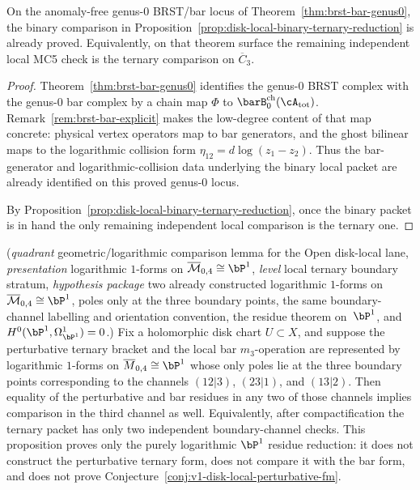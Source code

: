 \begin{corollary}\label{cor:disk-local-ternary-on-brstbar-locus}
On the anomaly-free genus-$0$ BRST/bar locus of
Theorem~\ref{thm:brst-bar-genus0}, the binary comparison in
Proposition~\ref{prop:disk-local-binary-ternary-reduction} is already
proved. Equivalently, on that theorem surface the remaining
independent local MC5 check is the ternary comparison on
$\overline{C}_3$.
\end{corollary}

\begin{proof}
Theorem~\ref{thm:brst-bar-genus0} identifies the genus-$0$ BRST complex
with the genus-$0$ bar complex by a chain map
\(\Phi\) to \(\barB^{\mathrm{ch}}_0(\cA_{\mathrm{tot}})\).
Remark~\ref{rem:brst-bar-explicit} makes the low-degree content of that
map concrete: physical vertex operators map to bar generators, and the
ghost bilinear maps to the logarithmic collision form
\(\eta_{12}=d\log(z_1-z_2)\).
Thus the bar-generator and logarithmic-collision data underlying the
binary local packet are already identified on this proved genus-$0$
locus.

By Proposition~\ref{prop:disk-local-binary-ternary-reduction}, once the
binary packet is in hand the only remaining independent local
comparison is the ternary one.
\end{proof}

\begin{proposition}
\label{prop:compactified-ternary-two-channel}
\textup{(}\emph{quadrant} geometric/logarithmic comparison lemma for
the Open disk-local lane, \emph{presentation} logarithmic $1$-forms on
$\overline{\mathcal{M}}_{0,4} \cong \bP^1$,
\emph{level} local ternary boundary stratum,
\emph{hypothesis package} two already constructed logarithmic
$1$-forms on $\overline{\mathcal{M}}_{0,4} \cong \bP^1$, poles only at
the three boundary points, the same boundary-channel labelling and
orientation convention, the residue theorem on~$\bP^1$, and
$H^0(\bP^1,\Omega^1_{\bP^1})=0$.\textup{)}
Fix a holomorphic disk chart $U \subset X$, and suppose the
perturbative ternary bracket and the local bar $m_3$-operation are
represented by logarithmic $1$-forms on
$\overline{M}_{0,4} \cong \bP^1$ whose only poles lie at the three
boundary points corresponding to the channels
$(12|3)$, $(23|1)$, and $(13|2)$.
Then equality of the perturbative and bar residues in any two of those
channels
implies comparison in the third channel as well.
Equivalently, after compactification the ternary packet has only two
independent boundary-channel checks.
This proposition proves only the purely logarithmic $\bP^1$ residue
reduction: it does not construct the perturbative ternary form, does
not compare it with the bar form, and does not prove
Conjecture~\ref{conj:v1-disk-local-perturbative-fm}.
\end{proposition}

